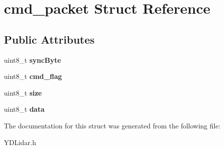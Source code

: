 \hypertarget{structcmd__packet}{}\section{cmd\+\_\+packet Struct Reference}
\label{structcmd__packet}
\subsection*{Public Attributes}
\begin{DoxyCompactItemize}
\item 
uint8\+\_\+t {\bfseries sync\+Byte}\hypertarget{structcmd__packet_afbbf12329459d281e93fc742d1a78009}{}\label{structcmd__packet_afbbf12329459d281e93fc742d1a78009}

\item 
uint8\+\_\+t {\bfseries cmd\+\_\+flag}\hypertarget{structcmd__packet_a87508f8232c382897c9159026985f3eb}{}\label{structcmd__packet_a87508f8232c382897c9159026985f3eb}

\item 
uint8\+\_\+t {\bfseries size}\hypertarget{structcmd__packet_aff384923e9d1d54d526ca755529eac05}{}\label{structcmd__packet_aff384923e9d1d54d526ca755529eac05}

\item 
uint8\+\_\+t {\bfseries data}\hypertarget{structcmd__packet_a3b8820a6357e147dd00ea67d9c9484c0}{}\label{structcmd__packet_a3b8820a6357e147dd00ea67d9c9484c0}

\end{DoxyCompactItemize}


The documentation for this struct was generated from the following file\+:\begin{DoxyCompactItemize}
\item 
Y\+D\+Lidar.\+h\end{DoxyCompactItemize}
